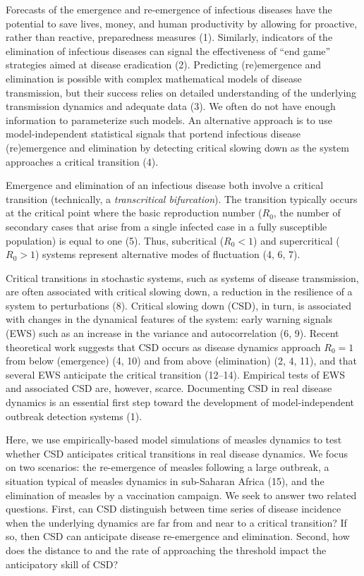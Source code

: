 \documentclass[3p]{elsarticle} %
\begin{document}
Forecasts of the emergence and re-emergence of infectious diseases have
the potential to save lives, money, and human productivity by allowing
for proactive, rather than reactive, preparedness measures (1).
Similarly, indicators of the elimination of infectious diseases can
signal the effectiveness of ``end game'' strategies aimed at disease
eradication (2). Predicting (re)emergence and elimination is possible
with complex mathematical models of disease transmission, but their
success relies on detailed understanding of the underlying transmission
dynamics and adequate data (3). We often do not have enough information
to parameterize such models. An alternative approach is to use
model-independent statistical signals that portend infectious disease
(re)emergence and elimination by detecting critical slowing down as the
system approaches a critical transition (4).

Emergence and elimination of an infectious disease both involve a
critical transition (technically, a \emph{transcritical bifurcation}).
The transition typically occurs at the critical point where the basic
reproduction number (\(R_0\), the number of secondary cases that arise
from a single infected case in a fully susceptible population) is equal
to one (5). Thus, subcritical (\(R_0 < 1\)) and supercritical
(\(R_0 > 1\)) systems represent alternative modes of fluctuation (4, 6,
7).

Critical transitions in stochastic systems, such as systems of disease
transmission, are often associated with critical slowing down, a
reduction in the resilience of a system to perturbations (8). Critical
slowing down (CSD), in turn, is associated with changes in the dynamical
features of the system: early warning signals (EWS) such as an increase
in the variance and autocorrelation (6, 9). Recent theoretical work
suggests that CSD occurs as disease dynamics approach \(R_0 = 1\) from
below (emergence) (4, 10) and from above (elimination) (2, 4, 11), and
that several EWS anticipate the critical transition (12--14). Empirical
tests of EWS and associated CSD are, however, scarce. Documenting CSD in
real disease dynamics is an essential first step toward the development
of model-independent outbreak detection systems (1).

Here, we use empirically-based model simulations of measles dynamics to
test whether CSD anticipates critical transitions in real disease
dynamics. We focus on two scenarios: the re-emergence of measles
following a large outbreak, a situation typical of measles dynamics in
sub-Saharan Africa (15), and the elimination of measles by a vaccination
campaign. We seek to answer two related questions. First, can CSD
distinguish between time series of disease incidence when the underlying
dynamics are far from and near to a critical transition? If so, then CSD
can anticipate disease re-emergence and elimination. Second, how does
the distance to and the rate of approaching the threshold impact the
anticipatory skill of CSD?
\end{document}
